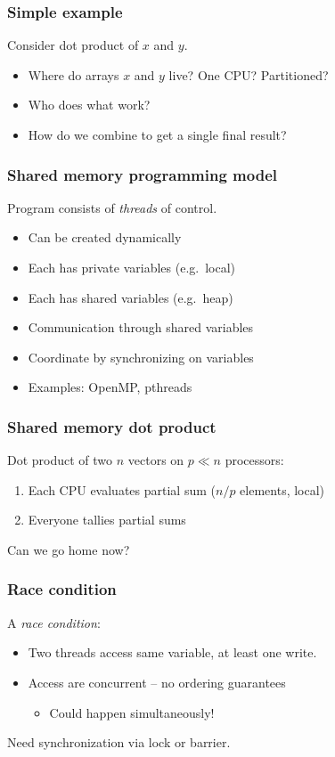 \documentclass{beamer}
\begin{document}
\begin{frame}
  \frametitle{Simple example}

  Consider dot product of $x$ and $y$.
  \begin{itemize}
    \item Where do arrays $x$ and $y$ live?  One CPU?  Partitioned?
    \item Who does what work?
    \item How do we combine to get a single final result?
  \end{itemize}
\end{frame}


\begin{frame}
  \frametitle{Shared memory programming model}
  
  \begin{center}
    
  \end{center}
  Program consists of {\em threads} of control.
  \begin{itemize}
  \item Can be created dynamically
  \item Each has private variables (e.g.~local)
  \item Each has shared variables (e.g.~heap)
  \item Communication through shared variables
  \item Coordinate by synchronizing on variables
  \item Examples: OpenMP, pthreads
  \end{itemize}
\end{frame}


\begin{frame}
  \frametitle{Shared memory dot product}
  
  Dot product of two $n$ vectors on $p \ll n$ processors:
  \begin{enumerate}
  \item Each CPU evaluates partial sum ($n/p$ elements, local)
  \item Everyone tallies partial sums
  \end{enumerate}
  Can we go home now?
\end{frame}


\begin{frame}
  \frametitle{Race condition}

  A {\em race condition}:
  \begin{itemize}
  \item Two threads access same variable, at least one write.
  \item Access are concurrent -- no ordering guarantees
    \begin{itemize}
    \item Could happen simultaneously!
    \end{itemize}
  \end{itemize}
  Need synchronization via lock or barrier.
\end{frame}
\end{document}
